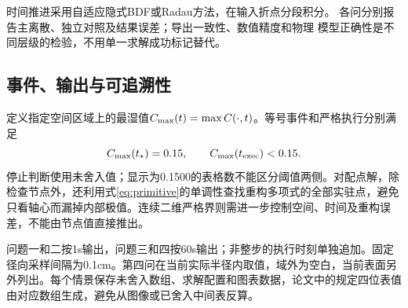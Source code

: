 时间推进采用自适应隐式BDF或Radau方法，在输入折点分段积分。
各问分别报告主离散、独立对照及结果误差；导出一致性、数值精度和物理
模型正确性是不同层级的检验，不用单一求解成功标记替代。

\subsection{事件、输出与可追溯性}
定义指定空间区域上的最湿值$C_{\max}(t)=\max C(\cdot,t)$。等号事件和严格执行分别满足
\begin{equation}
C_{\max}(t_*)=0.15,\qquad C_{\max}(t_{\mathrm{exec}})<0.15.
\label{eq:event}
\end{equation}
停止判断使用未舍入值；显示为0.1500的表格数不能区分阈值两侧。对配点解，除检查节点外，还利用式\eqref{eq:primitive}的单调性查找重构多项式的全部实驻点，避免只看轴心而漏掉内部极值。连续二维严格界则需进一步控制空间、时间及重构误差，不能由节点值直接推出。

问题一和二按1\unit{s}输出，问题三和四按60\unit{s}输出；非整步的执行时刻单独追加。固定径向采样间隔为0.1\unit{cm}。第四问在当前实际半径内取值，域外为空白，当前表面另外列出。每个情景保存未舍入数组、求解配置和图表数据，论文中的规定四位表值由对应数组生成，避免从图像或已舍入中间表反算。
